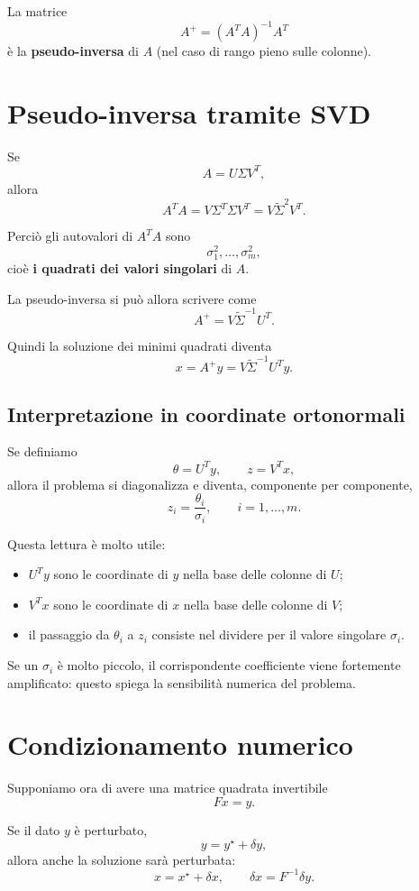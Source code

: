 La matrice
\[
\boxed{
A^+=(A^TA)^{-1}A^T
}
\]
è la \textbf{pseudo-inversa} di \(A\) (nel caso di rango pieno sulle colonne).

\section{Pseudo-inversa tramite SVD}

Se
\[
A=U\Sigma V^T,
\]
allora
\[
A^TA = V\Sigma^T\Sigma V^T
      = V\widetilde\Sigma^2V^T.
\]

Perciò gli autovalori di \(A^TA\) sono
\[
\sigma_1^2,\dots,\sigma_m^2,
\]
cioè \textbf{i quadrati dei valori singolari} di \(A\).

La pseudo-inversa si può allora scrivere come
\[
\boxed{
A^+=V\widetilde\Sigma^{-1}U^T.
}
\]

Quindi la soluzione dei minimi quadrati diventa
\[
\boxed{
x=A^+y=V\widetilde\Sigma^{-1}U^Ty.
}
\]

\subsection{Interpretazione in coordinate ortonormali}

Se definiamo
\[
\theta = U^Ty,
\qquad
z = V^Tx,
\]
allora il problema si diagonalizza e diventa, componente per componente,
\[
z_i = \frac{\theta_i}{\sigma_i},
\qquad i=1,\dots,m.
\]

Questa lettura è molto utile:
\begin{itemize}
    \item \(U^Ty\) sono le coordinate di \(y\) nella base delle colonne di \(U\);
    \item \(V^Tx\) sono le coordinate di \(x\) nella base delle colonne di \(V\);
    \item il passaggio da \(\theta_i\) a \(z_i\) consiste nel dividere per il valore singolare \(\sigma_i\).
\end{itemize}

Se un \(\sigma_i\) è molto piccolo, il corrispondente coefficiente viene fortemente amplificato: questo spiega la sensibilità numerica del problema.

\section{Condizionamento numerico}

Supponiamo ora di avere una matrice quadrata invertibile
\[
Fx=y.
\]

Se il dato \(y\) è perturbato,
\[
y=y^\star+\delta y,
\]
allora anche la soluzione sarà perturbata:
\[
x=x^\star+\delta x,
\qquad
\delta x = F^{-1}\delta y.
\]

